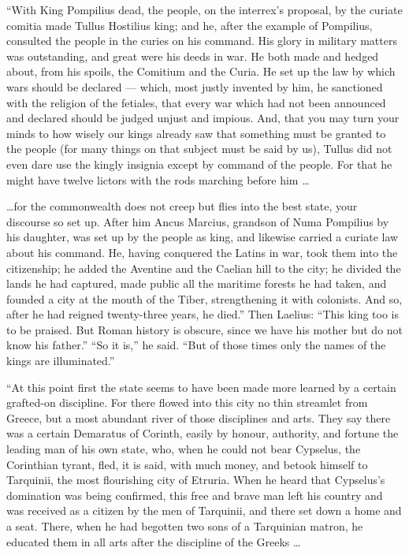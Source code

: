  ``With King Pompilius dead, the people, on the interrex's proposal, by the curiate comitia made Tullus Hostilius king; and he, after the example of Pompilius, consulted the people in the curies on his command. His glory in military matters was outstanding, and great were his deeds in war. He both made and hedged about, from his spoils, the Comitium and the Curia. He set up the law by which wars should be declared --- which, most justly invented by him, he sanctioned with the religion of the fetiales, that every war which had not been announced and declared should be judged unjust and impious. And, that you may turn your minds to how wisely our kings already saw that something must be granted to the people (for many things on that subject must be said by us), Tullus did not even dare use the kingly insignia except by command of the people. For that he might have twelve lictors with the rods marching before him \ldots

 \ldots for the commonwealth does not creep but flies into the best state, your discourse so set up. After him Ancus Marcius, grandson of Numa Pompilius by his daughter, was set up by the people as king, and likewise carried a curiate law about his command. He, having conquered the Latins in war, took them into the citizenship; he added the Aventine and the Caelian hill to the city; he divided the lands he had captured, made public all the maritime forests he had taken, and founded a city at the mouth of the Tiber, strengthening it with colonists. And so, after he had reigned twenty-three years, he died.'' Then Laelius: ``This king too is to be praised. But Roman history is obscure, since we have his mother but do not know his father.'' ``So it is,'' he said. ``But of those times only the names of the kings are illuminated.''

 ``At this point first the state seems to have been made more learned by a certain grafted-on discipline. For there flowed into this city no thin streamlet from Greece, but a most abundant river of those disciplines and arts. They say there was a certain Demaratus of Corinth, easily by honour, authority, and fortune the leading man of his own state, who, when he could not bear Cypselus, the Corinthian tyrant, fled, it is said, with much money, and betook himself to Tarquinii, the most flourishing city of Etruria. When he heard that Cypselus's domination was being confirmed, this free and brave man left his country and was received as a citizen by the men of Tarquinii, and there set down a home and a seat. There, when he had begotten two sons of a Tarquinian matron, he educated them in all arts after the discipline of the Greeks \ldots

